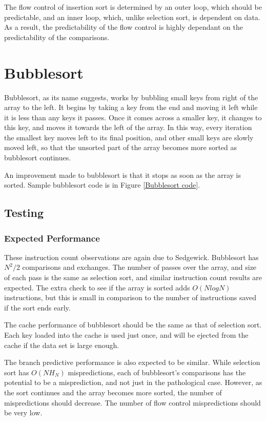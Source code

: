 The flow control of insertion sort is determined by an outer loop, which should
be predictable, and an inner loop, which, unlike selection sort, is dependent on
data. As a result, the predictability of the flow control is highly dependant on
the predictability of the comparisons.

\section{Bubblesort}
Bubblesort, as its name suggests, works by bubbling small keys from right of
the array to the left. It begins by taking a key from the end and moving it left
while it is less than any keys it passes. Once it comes across a smaller key, it
changes to this key, and moves it towards the left of the array. In this way, every
iteration the smallest key moves left to its final position, and other small
keys are slowly moved left, so that the unsorted part of the array becomes more
sorted as bubblesort continues.

An improvement made to bubblesort is that it stops as soon as the array is
sorted. Sample bubblesort code is in Figure \vref{Bubblesort code}.

\subsection{Testing}
\subsubsection{Expected Performance}
These instruction count observations are again due to Sedgewick. Bubblesort has
$N^2/2$ comparisons and exchanges. The number of passes over the array, and size
of each pass is the same as selection sort, and similar instruction count
results are expected. The extra check to see if the array is sorted adds
$O(NlogN)$ instructions, but this is small in comparison to the number of
instructions saved if the sort ends early.

The cache performance of bubblesort should be the same as that of selection
sort. Each key loaded into the cache is used just once, and will be ejected from
the cache if the data set is large enough.

The branch predictive performance is also expected to be similar. While
selection sort has $O(NH_N)$ mispredictions, each of bubblesort's comparisons
has the potential to be a misprediction, and not just in the pathological case.
However, as the sort continues and the array becomes more sorted, the number of
mispredictions should decrease. The number of flow control mispredictions should
be very low.

